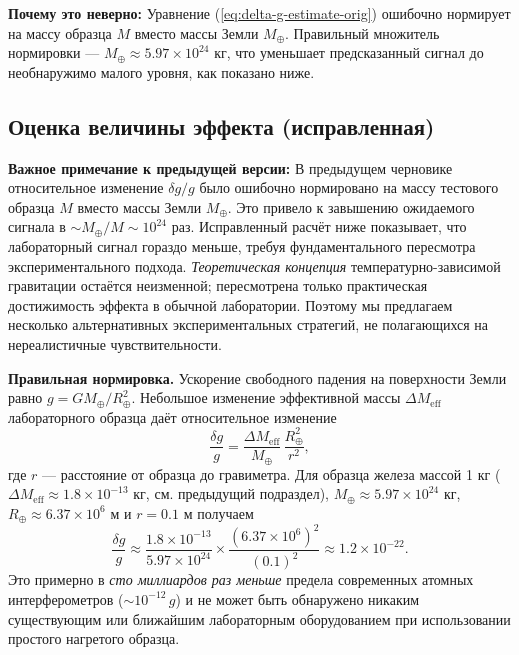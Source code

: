 \documentclass[12pt]{article}
\theoremstyle{remark}
\begin{document}
	\textbf{Почему это неверно:} Уравнение (\ref{eq:delta-g-estimate-orig}) ошибочно нормирует на массу образца $M$ вместо массы Земли $M_\oplus$. Правильный множитель нормировки — $M_\oplus \approx 5.97\times10^{24}$ кг, что уменьшает предсказанный сигнал до необнаружимо малого уровня, как показано ниже.
	
	\subsection{Оценка величины эффекта (исправленная)}
	\label{subsec:lab-estimate-corrected}
	
	\textbf{Важное примечание к предыдущей версии:} В предыдущем черновике относительное изменение $\delta g/g$ было ошибочно нормировано на массу тестового образца $M$ вместо массы Земли $M_\oplus$. Это привело к завышению ожидаемого сигнала в $\sim M_\oplus/M \sim 10^{24}$ раз. Исправленный расчёт ниже показывает, что лабораторный сигнал гораздо меньше, требуя фундаментального пересмотра экспериментального подхода. \emph{Теоретическая концепция} температурно-зависимой гравитации остаётся неизменной; пересмотрена только практическая достижимость эффекта в обычной лаборатории. Поэтому мы предлагаем несколько альтернативных экспериментальных стратегий, не полагающихся на нереалистичные чувствительности.
	
	\textbf{Правильная нормировка.} Ускорение свободного падения на поверхности Земли равно $g = G M_\oplus / R_\oplus^2$. Небольшое изменение эффективной массы $\Delta M_{\mathrm{eff}}$ лабораторного образца даёт относительное изменение
	\begin{equation}
		\frac{\delta g}{g} = \frac{\Delta M_{\mathrm{eff}}}{M_\oplus}\,
		\frac{R_\oplus^2}{r^2},
		\label{eq:delta-g-correct}
	\end{equation}
	где $r$ — расстояние от образца до гравиметра. Для образца железа массой 1 кг ($\Delta M_{\mathrm{eff}} \approx 1.8\times10^{-13}$ кг, см. предыдущий подраздел), $M_\oplus \approx 5.97\times10^{24}$ кг, $R_\oplus \approx 6.37\times10^{6}$ м и $r = 0.1$ м получаем
	\[
	\frac{\delta g}{g} \approx
	\frac{1.8\times10^{-13}}{5.97\times10^{24}} \times
	\frac{(6.37\times10^{6})^2}{(0.1)^2}
	\approx 1.2\times10^{-22}.
	\]
	Это примерно в \emph{сто миллиардов раз меньше} предела современных атомных интерферометров ($\sim 10^{-12}\,g$) и не может быть обнаружено никаким существующим или ближайшим лабораторным оборудованием при использовании простого нагретого образца.
	
\end{document}
